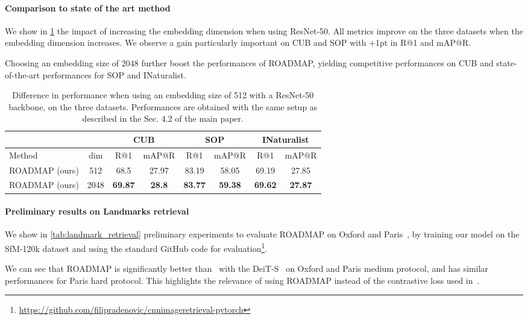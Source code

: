 \paragraph*{Comparison to state of the art method}

We show in \cref{tab:embedding_dim} the impact of increasing the embedding dimension when using ResNet-50. All metrics improve on the three datasets when the embedding dimension increases. We observe a gain particularly important on CUB and SOP with +1pt in R@1 and mAP@R. 


Choosing an embedding size of 2048 further boost the performances of ROADMAP, yielding competitive performances on CUB and state-of-the-art performances for SOP and INaturalist.


\begin{table}[h!]
    \caption{Difference in performance when using an embedding size of 512  with a ResNet-50 backbone, on the three datasets. Performances are obtained with the same setup as described in the Sec. 4.2 of the main paper.}
    \label{tab:embedding_dim}
    \centering
    \begin{tabular}{ l c cc cc cc }
        \toprule
         && \multicolumn{2}{c}{CUB} &\multicolumn{2}{c}{SOP} & \multicolumn{2}{c}{INaturalist}\\
         \midrule
         Method & dim & R@1 & mAP@R & R@1 & mAP@R & R@1 & mAP@R \\
         \midrule
         ROADMAP (ours) & 512 & 68.5 & 27.97 & 83.19 & 58.05 & 69.19 & 27.85 \\
         ROADMAP (ours) & 2048 & \textbf{69.87} & \textbf{28.8} & \textbf{83.77} & \textbf{59.38} & \textbf{69.62} & \textbf{27.87} \\
         \bottomrule
    \end{tabular}
\end{table}



\paragraph*{Preliminary results on Landmarks retrieval} We show in \cref{tab:landmark_retrieval} preliminary experiments to evaluate ROADMAP on Oxford and Paris~\cite{Radenovic-CVPR18}, by training our model on the SfM-120k dataset and using the standard GitHub code for evaluation\footnote{\url{https://github.com/filipradenovic/cnnimageretrieval-pytorch}}.

We can see that ROADMAP is significantly better than~\cite{transformer_ir} with the DeiT-S~\cite{deit} on Oxford and Paris medium protocol, and has similar performances for Paris hard protocol. This highlights the relevance of using ROADMAP instead of the contrastive loss used in~\cite{transformer_ir}.

